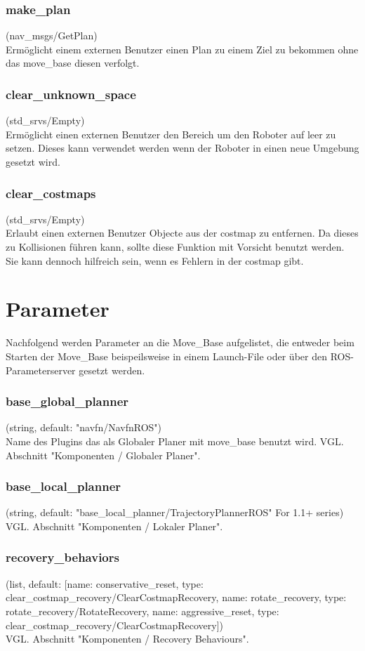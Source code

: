 \documentclass[oribibl]{llncs}
\begin{document}
\subsubsection{make\_plan} (nav\_msgs/GetPlan)\\
	Ermöglicht einem externen Benutzer einen Plan zu einem Ziel zu bekommen ohne 	das move\_base diesen verfolgt.
\subsubsection{clear\_unknown\_space} (std\_srvs/Empty)\\
	Ermöglicht einen externen Benutzer den Bereich um den Roboter auf leer zu setzen. 	Dieses kann verwendet werden wenn der Roboter in einen neue Umgebung gesetzt 	wird.
\subsubsection{clear\_costmaps} (std\_srvs/Empty)\\
	Erlaubt einen externen Benutzer Objecte aus der costmap zu entfernen. Da dieses 	zu Kollisionen führen kann, sollte diese Funktion mit Vorsicht benutzt werden. Sie 	kann dennoch hilfreich sein, wenn es Fehlern in der costmap gibt.
	
\section{Parameter}
Nachfolgend werden Parameter an die Move\_Base aufgelistet, die entweder beim Starten der Move\_Base beispeilsweise in einem Launch-File oder über den ROS-Parameterserver gesetzt werden.
\subsubsection{base\_global\_planner} (string, default: "navfn/NavfnROS")\\
   Name des Plugins das als Globaler Planer mit move\_base benutzt wird. VGL. Abschnitt "Komponenten / Globaler Planer".

\subsubsection{base\_local\_planner} (string, default: "base\_local\_planner/TrajectoryPlannerROS" For 1.1+ series)\\
   VGL. Abschnitt "Komponenten / Lokaler Planer".
   
   
\subsubsection{recovery\_behaviors} (list, default: [{name: conservative\_reset, type: clear\_costmap\_recovery/ClearCostmapRecovery}, {name: rotate\_recovery, type: rotate\_recovery/RotateRecovery}, {name: aggressive\_reset, type: clear\_costmap\_recovery/ClearCostmapRecovery}])\\
   VGL. Abschnitt "Komponenten / Recovery Behaviours".
   
\end{document}
